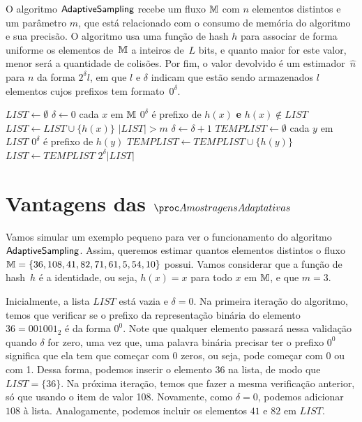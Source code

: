 O algoritmo $\textsf{AdaptiveSampling}$ recebe um fluxo $\mathbb{M}$ com $n$ elementos distintos e um parâmetro $m$, que está relacionado com o 
consumo de memória do algoritmo e sua precisão. O algoritmo usa uma função de hash $h$ para associar de forma uniforme 
os elementos de~$\mathbb{M}$ a inteiros de~$L$ bits, e quanto maior for este valor, menor será a quantidade de colisões. Por 
fim, o valor devolvido é um estimador~$\hat{n}$ para $n$ da forma $2^{\delta} l$, em que $l$ e $\delta$ indicam que 
estão sendo armazenados $l$ elementos cujos prefixos tem formato~$0^{\delta}$. 

\begin{codebox}
  \li $LIST \gets \emptyset$
  \li $\delta \gets 0$
  \li \For cada $x$ em $\mathbb{M}$ 
  \li    \Do 
         \If $0^{\delta}$ é prefixo de $h(x)$ \textbf{e} $h(x) \not\in LIST$
  \li             \Then $LIST \gets LIST \cup \{ h(x) \}$
         \End
  \li    \While $|LIST| > m$                                   \label{li:as:while}
  \li    \Do
         $\delta \gets \delta + 1$
  \li    $TEMPLIST \gets \emptyset$
  \li    \For cada $y$ em $LIST$
  \li    \Do
            \If $0^{\delta}$ é prefixo de $h(y)$
  \li       \Then $TEMPLIST \gets TEMPLIST \cup \{ h(y) \}$
            \End
         \End
  \li    $LIST \gets TEMPLIST$
         \End 
      \End
  \li
  \Return $2^{\delta} |LIST|$   
  \End
\end{codebox}


\section{Vantagens das $\asampling$}
\label{lab:chapter:04:02}

Vamos simular um exemplo pequeno para ver o funcionamento do algoritmo $\textsf{AdaptiveSampling}$. Assim, queremos estimar quantos elementos 
distintos o fluxo $\mathbb{M} = \{ 36, 108, 41, 82, 71, 61, 5, 54, 10 \}$ possui. Vamos considerar que a função de hash~$h$ é
a identidade, ou seja, $h(x) = x$ para todo $x$ em $\mathbb{M}$, e que $m = 3$. 

Inicialmente, a lista $LIST$ está vazia e $\delta = 0$. Na primeira iteração do algoritmo, temos que verificar se o 
prefixo da representação binária do elemento $36 = 001001_2$ é da forma $0^0$. Note que qualquer elemento passará nessa 
validação quando $\delta$ for zero, uma vez que, uma palavra binária precisar ter o prefixo $0^0$ significa que ela tem 
que começar com 0 zeros, ou seja, pode começar com 0 ou com 1. Dessa forma, podemos inserir o elemento $36$ na lista, de 
modo que $LIST = \{ 36 \}$. Na próxima iteração, temos que fazer a mesma verificação anterior, só que usando o item de 
valor 108. Novamente, como $\delta = 0$, podemos adicionar $108$ à lista. Analogamente, podemos incluir os elementos 
$41$ e $82$ em $LIST$. 

